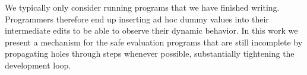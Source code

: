 We typically only consider running programs that we have finished
writing. Programmers therefore end up inserting ad hoc dummy values into
their intermediate edits to be able to observe their dynamic behavior. In
this work we present a mechanism for the safe evaluation programs that are
still incomplete by propagating holes through steps whenever possible,
substantially tightening the development loop.
